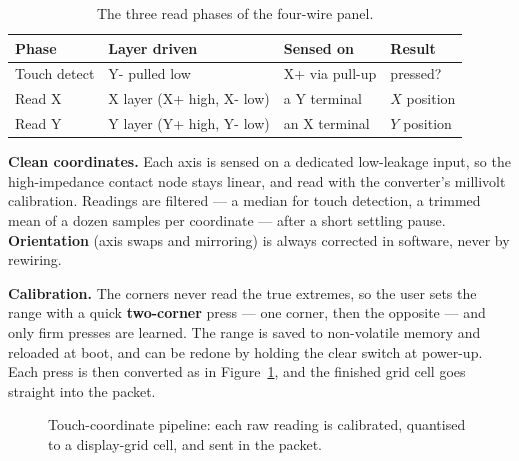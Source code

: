 \documentclass[11pt]{report}
\begin{document}
\begin{table}[ht]
\centering
\footnotesize
\renewcommand{\arraystretch}{1.2}
\begin{tabularx}{\textwidth}{@{}>{\raggedright\arraybackslash}p{2.2cm} >{\raggedright\arraybackslash}X >{\raggedright\arraybackslash}X >{\raggedright\arraybackslash}p{2.0cm}@{}}
\toprule
\textbf{Phase} & \textbf{Layer driven} & \textbf{Sensed on} & \textbf{Result} \\
\midrule
Touch detect & Y- pulled low & X+ via pull-up & pressed? \\
Read X & X layer (X+ high, X- low) & a Y terminal & $X$ position \\
Read Y & Y layer (Y+ high, Y- low) & an X terminal & $Y$ position \\
\bottomrule
\end{tabularx}
\caption{The three read phases of the four-wire panel.}
\label{tab:phases}
\end{table}

\textbf{Clean coordinates.} Each axis is sensed on a dedicated low-leakage input, so the high-impedance contact node stays linear, and read with the converter's millivolt calibration. Readings are filtered --- a median for touch detection, a trimmed mean of a dozen samples per coordinate --- after a short settling pause. \textbf{Orientation} (axis swaps and mirroring) is always corrected in software, never by rewiring.

\textbf{Calibration.} The corners never read the true extremes, so the user sets the range with a quick \textbf{two-corner} press --- one corner, then the opposite --- and only firm presses are learned. The range is saved to non-volatile memory and reloaded at boot, and can be redone by holding the clear switch at power-up. Each press is then converted as in Figure~\ref{fig:pipeline}, and the finished grid cell goes straight into the packet.

\begin{figure}[ht]
\centering
{}
\caption{Touch-coordinate pipeline: each raw reading is calibrated, quantised to a display-grid cell, and sent in the packet.}
\label{fig:pipeline}
\end{figure}
\end{document}
